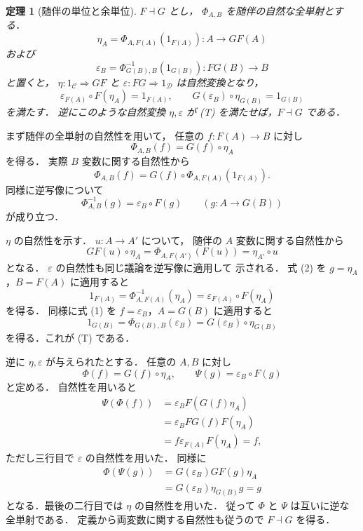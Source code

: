\documentclass[a5paper,10pt,onecolumn]{jsarticle}
\makeatletter
\theoremstyle{mathnotetheorem}
\newtheorem{theorem}{定理}[section]
\renewcommand{\proofname}{証明}
\renewenvironment{proof}[1][\proofname]{%
  \par\pushQED{\qed}\normalfont\topsep4\p@\@plus2\p@\relax
  \trivlist\item[\hskip\labelsep\bfseries #1]\ignorespaces
}{\popQED\endtrivlist\@endpefalse}
\makeatother
\begin{document}
\begin{theorem}[随伴の単位と余単位]\label{thm:unit-counit}
$F\dashv G$ とし，
$\Phi_{A,B}$ を随伴の自然な全単射とする．
\[
 \eta_A=\Phi_{A,F(A)}(1_{F(A)}):
 A\longrightarrow GF(A)
\]
および
\[
 \varepsilon_B=\Phi^{-1}_{G(B),B}(1_{G(B)}):
 FG(B)\longrightarrow B
\]
と置くと，
$\eta:1_{\mathcal C}\Rightarrow GF$ と
$\varepsilon:FG\Rightarrow1_{\mathcal D}$
は自然変換となり，
\[
 \varepsilon_{F(A)}\circ F(\eta_A)=1_{F(A)},
 \qquad
 G(\varepsilon_B)\circ\eta_{G(B)}=1_{G(B)}
 \tag{T}
\]
を満たす．
逆にこのような自然変換 $\eta,\varepsilon$ が
(T) を満たせば，$F\dashv G$ である．
\end{theorem}
\begin{proof}
まず随伴の全単射の自然性を用いて，
任意の $f:F(A)\to B$ に対し
\[
 \Phi_{A,B}(f)=G(f)\circ\eta_A
 \tag{1}
\]
を得る．
実際 $B$ 変数に関する自然性から
\[
 \Phi_{A,B}(f)
 =G(f)\circ\Phi_{A,F(A)}(1_{F(A)}).
\]
同様に逆写像について
\[
 \Phi^{-1}_{A,B}(g)=\varepsilon_B\circ F(g)
 \qquad(g:A\to G(B))
 \tag{2}
\]
が成り立つ．

$\eta$ の自然性を示す．
$u:A\to A'$ について，
随伴の $A$ 変数に関する自然性から
\[
 GF(u)\circ\eta_A
 =\Phi_{A,F(A')}(F(u))
 =\eta_{A'}\circ u
\]
となる．
$\varepsilon$ の自然性も同じ議論を逆写像に適用して
示される．
式 (2) を $g=\eta_A$，$B=F(A)$ に適用すると
\[
 1_{F(A)}
 =\Phi^{-1}_{A,F(A)}(\eta_A)
 =\varepsilon_{F(A)}\circ F(\eta_A)
\]
を得る．
同様に式 (1) を
$f=\varepsilon_B$，$A=G(B)$ に適用すると
\[
 1_{G(B)}
 =\Phi_{G(B),B}(\varepsilon_B)
 =G(\varepsilon_B)\circ\eta_{G(B)}
\]
を得る．これが (T) である．

逆に $\eta,\varepsilon$ が与えられたとする．
任意の $A,B$ に対し
\[
 \Phi(f)=G(f)\circ\eta_A,\qquad
 \Psi(g)=\varepsilon_B\circ F(g)
\]
と定める．
自然性を用いると
\begin{align*}
 \Psi(\Phi(f))
 &=\varepsilon_B F(G(f)\eta_A)\\
 &=\varepsilon_B FG(f)F(\eta_A)\\
 &=f\varepsilon_{F(A)}F(\eta_A)=f,
\end{align*}
ただし三行目で $\varepsilon$ の自然性を用いた．
同様に
\begin{align*}
 \Phi(\Psi(g))
 &=G(\varepsilon_B)GF(g)\eta_A\\
 &=G(\varepsilon_B)\eta_{G(B)}g=g
\end{align*}
となる．最後の二行目では $\eta$ の自然性を用いた．
従って $\Phi$ と $\Psi$ は互いに逆な全単射である．
定義から両変数に関する自然性も従うので
$F\dashv G$ を得る．
\end{proof}
\end{document}
